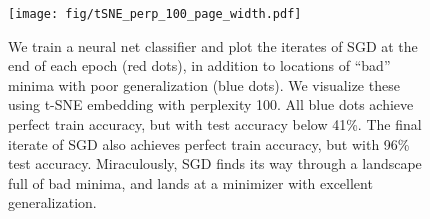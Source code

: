 \documentclass{article}
\newcommand{\zeyad}[1]{{  \textcolor{purple}{\bf \em [Zeyad: #1]}}}
\begin{document}
       \begin{figure}[b!]
        \centering
            \centering \texttt{[image: fig/tSNE\_perp\_100\_page\_width.pdf]}
            \label{fig:tSNE_perp100}
        \caption{\small  We train a neural net classifier and plot the iterates of SGD at the end of each epoch (red dots), in addition to locations of  ``bad'' minima with poor generalization (blue dots).  We visualize these using t-SNE embedding with perplexity 100.   All blue dots achieve perfect train accuracy, but with test accuracy below 41\%.  The final iterate of SGD also achieves perfect train accuracy, but with 96\% test accuracy.  Miraculously, SGD finds its way through a landscape full of bad minima, and lands at a minimizer with excellent generalization.
        }
        \label{fig:tsne}
    \end{figure}
\end{document}
